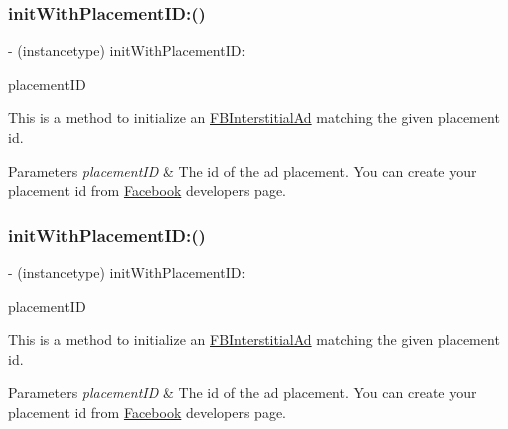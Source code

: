 \subsubsection{\texorpdfstring{init\+With\+Placement\+I\+D\+:()}{initWithPlacementID:()}\hspace{0.1cm}{\footnotesize\ttfamily [1/5]}}
{\footnotesize\ttfamily -\/ (instancetype) init\+With\+Placement\+I\+D\+: \begin{DoxyParamCaption}\item[{(N\+S\+String $\ast$)}]{placement\+ID }\end{DoxyParamCaption}}

This is a method to initialize an \hyperlink{interfaceFBInterstitialAd}{F\+B\+Interstitial\+Ad} matching the given placement id.


\begin{DoxyParams}{Parameters}
{\em placement\+ID} & The id of the ad placement. You can create your placement id from \hyperlink{interfaceFacebook}{Facebook} developers page. \\
\hline
\end{DoxyParams}
\mbox{\label{interfaceFBInterstitialAd_afb4f482b5ab19d486c77785c7794111d}} 
\subsubsection{\texorpdfstring{init\+With\+Placement\+I\+D\+:()}{initWithPlacementID:()}\hspace{0.1cm}{\footnotesize\ttfamily [2/5]}}
{\footnotesize\ttfamily -\/ (instancetype) init\+With\+Placement\+I\+D\+: \begin{DoxyParamCaption}\item[{(N\+S\+String $\ast$)}]{placement\+ID }\end{DoxyParamCaption}}

This is a method to initialize an \hyperlink{interfaceFBInterstitialAd}{F\+B\+Interstitial\+Ad} matching the given placement id.


\begin{DoxyParams}{Parameters}
{\em placement\+ID} & The id of the ad placement. You can create your placement id from \hyperlink{interfaceFacebook}{Facebook} developers page. \\
\hline
\end{DoxyParams}
\mbox{\label{interfaceFBInterstitialAd_afb4f482b5ab19d486c77785c7794111d}} 

